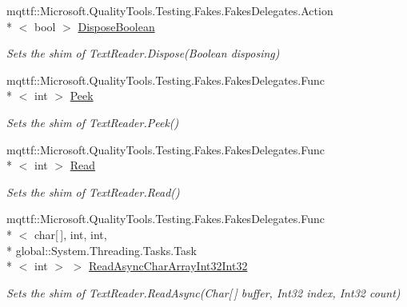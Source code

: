 \begin{DoxyCompactItemize}
mqttf\-::\-Microsoft.\-Quality\-Tools.\-Testing.\-Fakes.\-Fakes\-Delegates.\-Action\\*
$<$ bool $>$ \hyperlink{class_system_1_1_i_o_1_1_fakes_1_1_shim_text_reader_a10c06efc299cea38ced4d6a8924434bc}{Dispose\-Boolean}
\begin{DoxyCompactList}\small\item\em Sets the shim of Text\-Reader.\-Dispose(\-Boolean disposing)\end{DoxyCompactList}\item 
mqttf\-::\-Microsoft.\-Quality\-Tools.\-Testing.\-Fakes.\-Fakes\-Delegates.\-Func\\*
$<$ int $>$ \hyperlink{class_system_1_1_i_o_1_1_fakes_1_1_shim_text_reader_acde933b116160ca34ed160c4011143e1}{Peek}
\begin{DoxyCompactList}\small\item\em Sets the shim of Text\-Reader.\-Peek()\end{DoxyCompactList}\item 
mqttf\-::\-Microsoft.\-Quality\-Tools.\-Testing.\-Fakes.\-Fakes\-Delegates.\-Func\\*
$<$ int $>$ \hyperlink{class_system_1_1_i_o_1_1_fakes_1_1_shim_text_reader_aa4a42c020e680fc8175de8fa91d558c8}{Read}
\begin{DoxyCompactList}\small\item\em Sets the shim of Text\-Reader.\-Read()\end{DoxyCompactList}\item 
mqttf\-::\-Microsoft.\-Quality\-Tools.\-Testing.\-Fakes.\-Fakes\-Delegates.\-Func\\*
$<$ char\mbox{[}$\,$\mbox{]}, int, int, \\*
global\-::\-System.\-Threading.\-Tasks.\-Task\\*
$<$ int $>$ $>$ \hyperlink{class_system_1_1_i_o_1_1_fakes_1_1_shim_text_reader_a8a4979b0a6b0761dfc381a694c1d3cf9}{Read\-Async\-Char\-Array\-Int32\-Int32}
\begin{DoxyCompactList}\small\item\em Sets the shim of Text\-Reader.\-Read\-Async(\-Char\mbox{[}$\,$\mbox{]} buffer, Int32 index, Int32 count)\end{DoxyCompactList}\item 

\end{DoxyCompactItemize}
